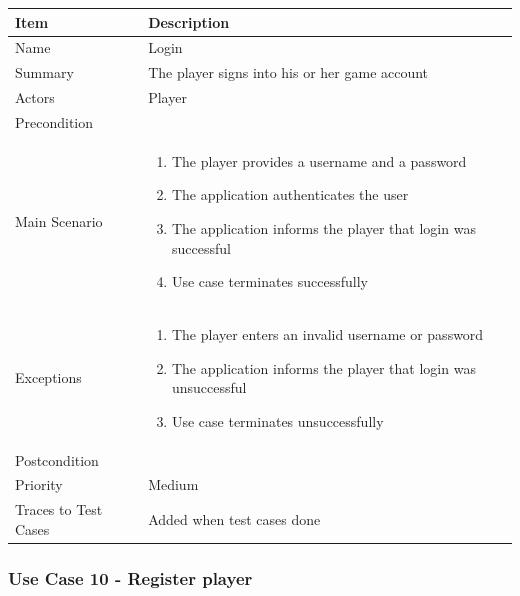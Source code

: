 \documentclass[12pt]{article}
\begin{document}
\begin{center}
\setlength{\tabcolsep}{18pt}
\renewcommand{\arraystretch}{1.3}
\begin{tabular}{ |p{3cm}|p{10cm}| }
    \hline
    \rowcolor{green}
   Item & Description \\
    \hline
    Name & Login \\
    \hline
    Summary & The player signs into his or her game account \\
    \hline
    Actors & Player \\
    \hline
    Precondition & \\
    \hline
    Main Scenario &     
    \vspace*{-0.2in}
    \begin{enumerate}
        \item The player provides a username and a password
        \item The application authenticates the user
        \item The application informs the player that login was successful
        \item Use case terminates successfully
    \end{enumerate}  \\
    \hline
    Exceptions & 
    \vspace*{-0.2in}
    \begin{enumerate}
        \item The player enters an invalid username or password
        \item The application informs the player that login was unsuccessful
        \item Use case terminates unsuccessfully
    \end{enumerate}  \\
    \hline
    Postcondition & \\
    \hline
    Priority & Medium  \\
    \hline
    Traces to Test Cases & Added when test cases done  \\
    \hline
\end{tabular}
\end{center}

\newpage


\subsubsection{Use Case 10 - Register player} \label{uc:10}
\end{document}
